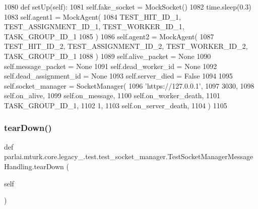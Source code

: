 \begin{DoxyCode}
1080     \textcolor{keyword}{def }setUp(self):
1081         self.fake\_socket = MockSocket()
1082         time.sleep(0.3)
1083         self.agent1 = MockAgent(
1084             TEST\_HIT\_ID\_1, TEST\_ASSIGNMENT\_ID\_1, TEST\_WORKER\_ID\_1, TASK\_GROUP\_ID\_1
1085         )
1086         self.agent2 = MockAgent(
1087             TEST\_HIT\_ID\_2, TEST\_ASSIGNMENT\_ID\_2, TEST\_WORKER\_ID\_2, TASK\_GROUP\_ID\_1
1088         )
1089         self.alive\_packet = \textcolor{keywordtype}{None}
1090         self.message\_packet = \textcolor{keywordtype}{None}
1091         self.dead\_worker\_id = \textcolor{keywordtype}{None}
1092         self.dead\_assignment\_id = \textcolor{keywordtype}{None}
1093         self.server\_died = \textcolor{keyword}{False}
1094 
1095         self.socket\_manager = SocketManager(
1096             \textcolor{stringliteral}{'https://127.0.0.1'},
1097             3030,
1098             self.on\_alive,
1099             self.on\_message,
1100             self.on\_worker\_death,
1101             TASK\_GROUP\_ID\_1,
1102             1,
1103             self.on\_server\_death,
1104         )
1105 
\end{DoxyCode}
\mbox{\label{classparlai_1_1mturk_1_1core_1_1legacy__2018_1_1test_1_1test__socket__manager_1_1TestSocketManagerMessageHandling_acf7ce56ce7032cc06cc8baf1bd0ae9c8}} 
\subsubsection{\texorpdfstring{tear\+Down()}{tearDown()}}
{\footnotesize\ttfamily def parlai.\+mturk.\+core.\+legacy\+\_.\+test.\+test\+\_\+socket\+\_\+manager.\+Test\+Socket\+Manager\+Message\+Handling.\+tear\+Down (\begin{DoxyParamCaption}\item[{}]{self }\end{DoxyParamCaption})}



